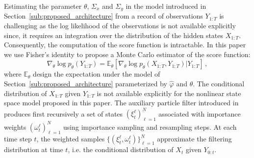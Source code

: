 \documentclass{article}
\begin{document}
Estimating the parameter $\theta$, $\Sigma_x$ and $\Sigma_y$ in the model introduced in Section~\ref{sub:proposed_architecture} from a record of observations $Y_{1:T}$ is challenging as the log likelihood of the observations is not available explicitly since, it requires an integration over the distribution of the hidden states $X_{1:T}$. Consequently, the computation of the score function is intractable.
In this paper we use Fisher's identity to propose a Monte Carlo estimator of the score function:
\begin{equation}
	\nabla_\theta \log p_\theta(Y_{1:T}) = \mathbb{E}_\theta \left[ \nabla_\theta\log p_\theta(X_{1:T}, Y_{1:T}) | Y_{1:T} \right]\,,
	\label{eq:grad_ll}
\end{equation}
where $\mathbb{E}_\theta$ design the expectation under the model of Section~\ref{sub:proposed_architecture} parameterized by $\widehat \varphi$ and $\theta$. The conditional distribution of $X_{1:T}$ given $Y_{1:T}$ is not available explicitly for the nonlinear state space model proposed in this paper. %
The auxiliary particle filter introduced in \cite{Jun1998} produces first recursively a set of states $(\xi^{\ell}_t)_{\ell=1}^N$ associated with importance weights $(\omega^{\ell}_t)_{\ell=1}^N$ using importance sampling and resampling steps.
At each time step $t$, the weighted samples $\{(\xi^{\ell}_t,\omega^{\ell}_t)\}_{\ell=1}^N$ approximate the filtering distribution at time $t$, i.e. the conditional distribution of $X_t$ given $Y_{0:t}$.
\end{document}
